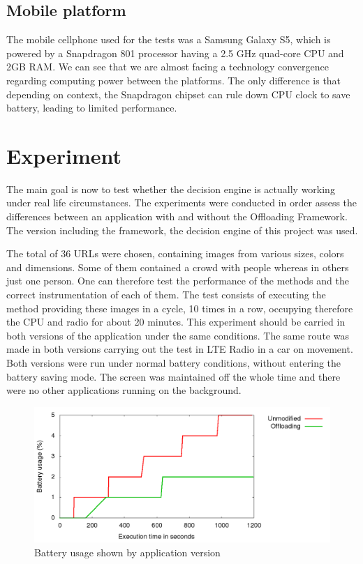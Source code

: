 \documentclass[10pt, conference, letterpaper]{IEEEtran}
\begin{document}
  \subsection{Mobile platform}
  The mobile cellphone used for the tests was a Samsung Galaxy S5, which is powered by a Snapdragon 801 processor having a 2.5 GHz quad-core CPU and 2GB RAM. We can see that we are almost facing a technology convergence regarding computing power between the platforms. The only difference is that depending on context, the Snapdragon chipset can rule down CPU clock to save battery, leading to limited performance.

  \section{Experiment}
  The main goal is now to test whether the decision engine is actually working under real life circumstances. The experiments were conducted in order assess the differences between an application with and without the Offloading Framework. The version including the framework, the decision engine of this project was used.

  The total of 36 URLs were chosen, containing images from various sizes, colors and dimensions. Some of them contained a crowd with people whereas in others just one person. One can therefore test the performance of the methods and the correct instrumentation of each of them. The test consists of executing the method providing these images in a cycle, 10 times in a row, occupying therefore the CPU and radio for about 20 minutes. This experiment should be carried in both versions of the application under the same conditions. The same route was made in both versions carrying out the test in LTE Radio in a car on movement. Both versions were run under normal battery conditions, without entering the battery saving mode. The screen was maintained off the whole time and there were no other applications running on the background.

\begin{figure}[!t]
  \centering
  \includegraphics[width=1\textwidth]{results/plots/executions.png}
  \caption{Battery usage shown by application version}
  \label{fig:batteryusage}
\end{figure}
\end{document}
